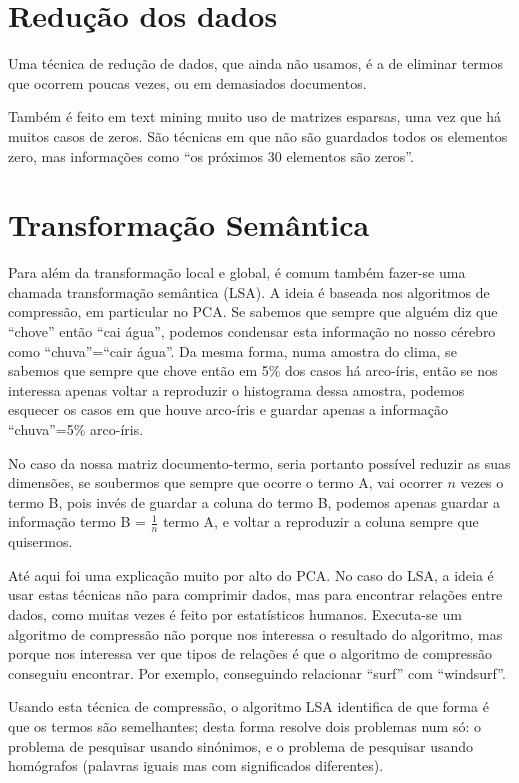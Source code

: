 \documentclass[twocolumn]{article}
\begin{document}
\section{Redução dos dados}

Uma técnica de redução de dados, que ainda não usamos, é a de eliminar termos que ocorrem poucas vezes, ou em demasiados documentos.

Também é feito em text mining muito uso de matrizes esparsas, uma vez que há muitos casos de zeros. São técnicas em que não são guardados todos os elementos zero, mas informações como ``os próximos 30 elementos são zeros''.

\section{Transformação Semântica}

Para além da transformação local e global, é comum também fazer-se uma chamada transformação semântica (LSA). A ideia é baseada nos algoritmos de compressão, em particular no PCA. Se sabemos que sempre que alguém diz que ``chove'' então ``cai água'', podemos condensar esta informação no nosso cérebro como ``chuva''=``cair água''. Da mesma forma, numa amostra do clima, se sabemos que sempre que chove então em 5\% dos casos há arco-íris, então se nos interessa apenas voltar a reproduzir o histograma dessa amostra, podemos esquecer os casos em que houve arco-íris e guardar apenas a informação ``chuva''=5\% arco-íris.

No caso da nossa matriz documento-termo, seria portanto possível reduzir as suas dimensões, se soubermos que sempre que ocorre o termo A, vai ocorrer $n$ vezes o termo B, pois invés de guardar a coluna do termo B, podemos apenas guardar a informação termo B = $\frac{1}{n}$ termo A, e voltar a reproduzir a coluna sempre que quisermos.

Até aqui foi uma explicação muito por alto do PCA. No caso do LSA, a ideia é usar estas técnicas não para comprimir dados, mas para encontrar relações entre dados, como muitas vezes é feito por estatísticos humanos. Executa-se um algoritmo de compressão não porque nos interessa o resultado do algoritmo, mas porque nos interessa ver que tipos de relações é que o algoritmo de compressão conseguiu encontrar. Por exemplo, conseguindo relacionar ``surf'' com ``windsurf''.

Usando esta técnica de compressão, o algoritmo LSA identifica de que forma é que os termos são semelhantes; desta forma resolve dois problemas num só: o problema de pesquisar usando sinónimos, e o problema de pesquisar usando homógrafos (palavras iguais mas com significados diferentes).
\end{document}
